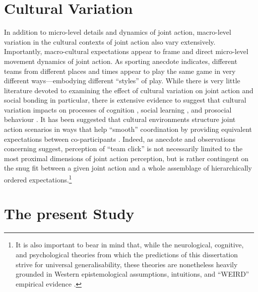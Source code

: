 \section{Cultural Variation}
In addition to micro-level details and dynamics of joint action, macro-level variation in the cultural contexts of joint action also vary extensively. Importantly, macro-cultural expectations appear to frame and direct micro-level movement dynamics of joint action.  As sporting anecdote indicates, different teams from different places and times appear to play the same game in very different ways---embodying different ``styles'' of play.  While there is very little literature devoted to examining the effect of cultural variation on joint action and social bonding in particular, there is extensive evidence to suggest that cultural variation impacts on processes of cognition \citep{Nisbett2003,Hoshino-Browne2005}, social learning \citep{Mesoudi2015}, and prosocial behaviour \citep{Yuki2005,Yuki2003}.
It has been suggested that cultural environments structure joint action scenarios in ways that help ``smooth'' coordination by providing equivalent expectations between co-participants \citep{Vesper2017}.  Indeed, as anecdote and observations concerning suggest, perception of ``team click'' is not necessarily limited to the most proximal dimensions of joint action perception, but is rather contingent on the snug fit between a given joint action and a whole assemblage of hierarchically ordered expectations.\footnote{It is also important to bear in mind that, while the neurological, cognitive, and psychological theories from which the predictions of this dissertation strive for universal generalisability, these theories are nonetheless heavily grounded in Western epistemological assumptions, intuitions, and ``WEIRD'' empirical evidence \citep{Henrich2010a}.}






\section{The present Study}
